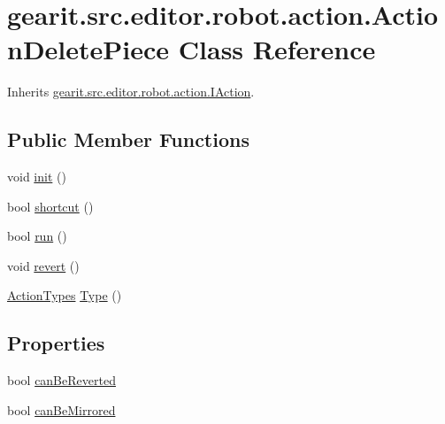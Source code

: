 \hypertarget{classgearit_1_1src_1_1editor_1_1robot_1_1action_1_1_action_delete_piece}{\section{gearit.\+src.\+editor.\+robot.\+action.\+Action\+Delete\+Piece Class Reference}
\label{classgearit_1_1src_1_1editor_1_1robot_1_1action_1_1_action_delete_piece}
}


Inherits \hyperlink{interfacegearit_1_1src_1_1editor_1_1robot_1_1action_1_1_i_action}{gearit.\+src.\+editor.\+robot.\+action.\+I\+Action}.

\subsection*{Public Member Functions}
\begin{DoxyCompactItemize}
\item 
void \hyperlink{classgearit_1_1src_1_1editor_1_1robot_1_1action_1_1_action_delete_piece_acaf6cd09124b6eef0fd41a94d257d700}{init} ()
\item 
bool \hyperlink{classgearit_1_1src_1_1editor_1_1robot_1_1action_1_1_action_delete_piece_a3251a6dc2372a0d2d4a15d2cd6953b37}{shortcut} ()
\item 
bool \hyperlink{classgearit_1_1src_1_1editor_1_1robot_1_1action_1_1_action_delete_piece_a0bcff2f0728aa7f0b82436120ff9254a}{run} ()
\item 
void \hyperlink{classgearit_1_1src_1_1editor_1_1robot_1_1action_1_1_action_delete_piece_af5b285acde410f86152aba7085232178}{revert} ()
\item 
\hyperlink{namespacegearit_1_1src_1_1editor_1_1robot_1_1action_a4be0fd46e3952d6135136b20e7b3fc5e}{Action\+Types} \hyperlink{classgearit_1_1src_1_1editor_1_1robot_1_1action_1_1_action_delete_piece_a5d361ba31c2142c4087dbfd0730db92e}{Type} ()
\end{DoxyCompactItemize}
\subsection*{Properties}
\begin{DoxyCompactItemize}
\item 
bool \hyperlink{classgearit_1_1src_1_1editor_1_1robot_1_1action_1_1_action_delete_piece_a08da080ad7ba2c18e0ed072af7910c26}{can\+Be\+Reverted}
\item 
bool \hyperlink{classgearit_1_1src_1_1editor_1_1robot_1_1action_1_1_action_delete_piece_a2b962ffb4ab95c5195709de2023e1b58}{can\+Be\+Mirrored}
\end{DoxyCompactItemize}


